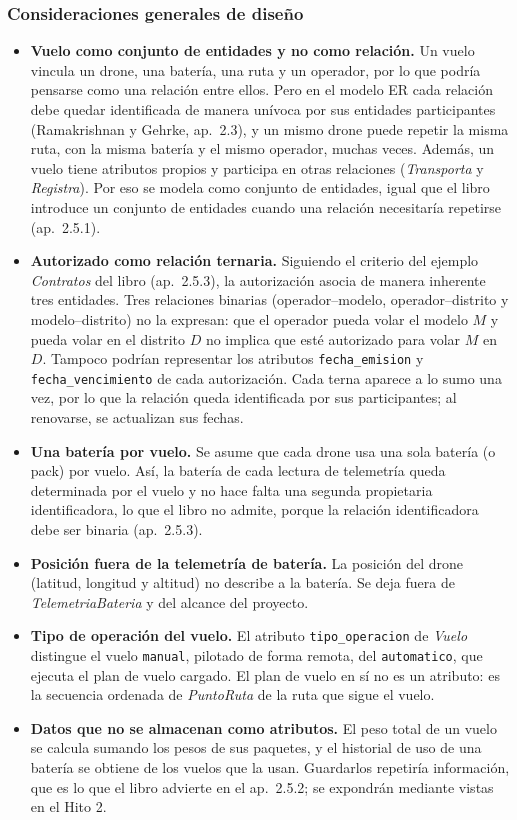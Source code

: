\documentclass[11pt,a4paper]{article}
\newcommand{\at}[1]{\texttt{#1}}
\begin{document}
\subsubsection{Consideraciones generales de diseño}
\begin{itemize}
\item \textbf{Vuelo como conjunto de entidades y no como relación.} Un vuelo vincula un drone, una batería, una ruta y un operador, por lo que podría pensarse como una relación entre ellos. Pero en el modelo ER cada relación debe quedar identificada de manera unívoca por sus entidades participantes (Ramakrishnan y Gehrke, ap.~2.3), y un mismo drone puede repetir la misma ruta, con la misma batería y el mismo operador, muchas veces. Además, un vuelo tiene atributos propios y participa en otras relaciones (\textit{Transporta} y \textit{Registra}). Por eso se modela como conjunto de entidades, igual que el libro introduce un conjunto de entidades cuando una relación necesitaría repetirse (ap.~2.5.1).
\item \textbf{Autorizado como relación ternaria.} Siguiendo el criterio del ejemplo \textit{Contratos} del libro (ap.~2.5.3), la autorización asocia de manera inherente tres entidades. Tres relaciones binarias (operador--modelo, operador--distrito y modelo--distrito) no la expresan: que el operador pueda volar el modelo $M$ y pueda volar en el distrito $D$ no implica que esté autorizado para volar $M$ en $D$. Tampoco podrían representar los atributos \at{fecha\_emision} y \at{fecha\_vencimiento} de cada autorización. Cada terna aparece a lo sumo una vez, por lo que la relación queda identificada por sus participantes; al renovarse, se actualizan sus fechas.
\item \textbf{Una batería por vuelo.} Se asume que cada drone usa una sola batería (o pack) por vuelo. Así, la batería de cada lectura de telemetría queda determinada por el vuelo y no hace falta una segunda propietaria identificadora, lo que el libro no admite, porque la relación identificadora debe ser binaria (ap.~2.5.3).
\item \textbf{Posición fuera de la telemetría de batería.} La posición del drone (latitud, longitud y altitud) no describe a la batería. Se deja fuera de \textit{TelemetriaBateria} y del alcance del proyecto.
\item \textbf{Tipo de operación del vuelo.} El atributo \at{tipo\_operacion} de \textit{Vuelo} distingue el vuelo \at{manual}, pilotado de forma remota, del \at{automatico}, que ejecuta el plan de vuelo cargado. El plan de vuelo en sí no es un atributo: es la secuencia ordenada de \textit{PuntoRuta} de la ruta que sigue el vuelo.
\item \textbf{Datos que no se almacenan como atributos.} El peso total de un vuelo se calcula sumando los pesos de sus paquetes, y el historial de uso de una batería se obtiene de los vuelos que la usan. Guardarlos repetiría información, que es lo que el libro advierte en el ap.~2.5.2; se expondrán mediante vistas en el Hito 2.
\end{itemize}
\end{document}
